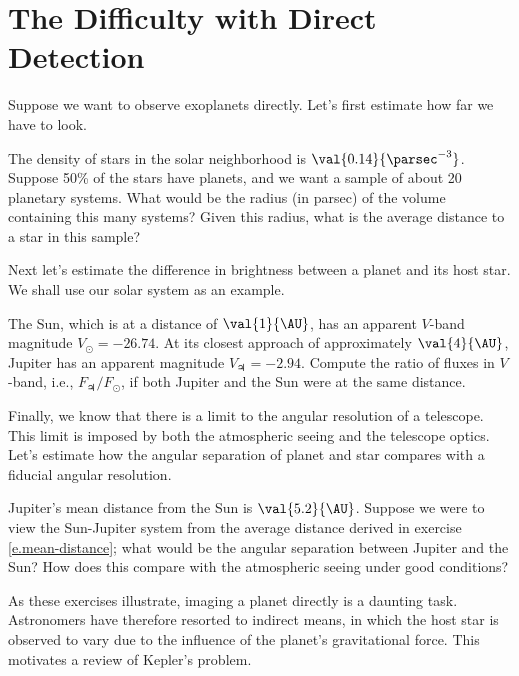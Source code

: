 
\section{The Difficulty with Direct Detection}

Suppose we want to observe exoplanets directly. Let's first estimate how far we have to look.  

\begin{exercisebox}
\label{e.mean-distance}
The density of stars in the solar neighborhood is $\val{0.14}{\parsec^{-3}}$.  Suppose 50\% of the stars have planets, and we want a sample of about 20 planetary systems.  What would be the radius (in parsec) of the volume containing this many systems?  Given this radius, what is the average distance to a star in this sample?
\end{exercisebox}

Next let's estimate the difference in brightness between a planet and its host star. We shall use our solar system as an example.

\begin{exercisebox}
The Sun, which is at a distance of $\val{1}{\AU}$, has an apparent $V$-band magnitude $V_{\odot} = -26.74$.  At its closest approach of approximately $\val{4}{\AU}$, Jupiter has an apparent magnitude $V_{\jupiter} = -2.94$.  Compute the ratio of fluxes in $V$-band, i.e., $F_{\jupiter}/F_{\odot}$, if both Jupiter and the Sun were at the same distance.
\end{exercisebox}

Finally, we know that there is a limit to the angular resolution of a telescope. This limit is imposed by both the atmospheric seeing and the telescope optics.  Let's estimate how the angular separation of planet and star compares with a fiducial angular resolution.

\begin{exercisebox}
Jupiter's mean distance from the Sun is $\val{5.2}{\AU}$. Suppose we were to view the Sun-Jupiter system from the average distance derived in exercise \ref{e.mean-distance}; what would be the angular separation between Jupiter and the Sun?  How does this compare with the atmospheric seeing under good conditions?
\end{exercisebox}

As these exercises illustrate, imaging a planet directly is a daunting task. Astronomers have therefore resorted to indirect means, in which the host star is observed to vary due to the influence of the planet's gravitational force. This motivates a review of Kepler's problem.

